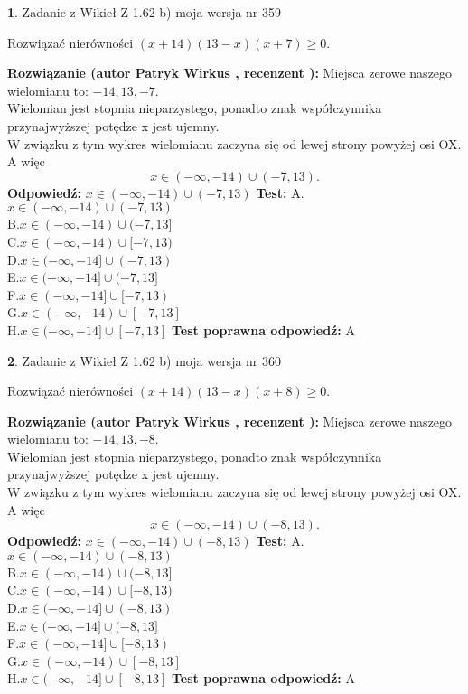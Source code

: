 \documentclass[12pt, a4paper]{article}
\theoremstyle{definition} %
\newtheorem{zad}{}
\newcommand{\zadStart}[1]{\begin{zad}#1\newline}
\newcommand{\zadStop}{\end{zad}}
\newcommand{\rozwStart}[2]{\noindent \textbf{Rozwiązanie (autor #1 , recenzent #2): }\newline}
\newcommand{\rozwStop}{\newline}
\newcommand{\odpStart}{\noindent \textbf{Odpowiedź:}\newline}
\newcommand{\odpStop}{\newline}
\newcommand{\testStart}{\noindent \textbf{Test:}\newline}
\newcommand{\testStop}{\newline}
\newcommand{\kluczStart}{\noindent \textbf{Test poprawna odpowiedź:}\newline}
\newcommand{\kluczStop}{\newline}
\begin{document}
\zadStart{Zadanie z Wikieł Z 1.62 b) moja wersja nr 359}

Rozwiązać nierówności $(x+14)(13-x)(x+7)\ge0$.
\zadStop
\rozwStart{Patryk Wirkus}{}
Miejsca zerowe naszego wielomianu to: $-14, 13, -7$.\\
Wielomian jest stopnia nieparzystego, ponadto znak współczynnika przy\linebreak najwyższej potędze x jest ujemny.\\ W związku z tym wykres wielomianu zaczyna się od lewej strony powyżej osi OX. A więc $$x \in (-\infty,-14) \cup (-7,13).$$
\rozwStop
\odpStart
$x \in (-\infty,-14) \cup (-7,13)$
\odpStop
\testStart
A.$x \in (-\infty,-14) \cup (-7,13)$\\
B.$x \in (-\infty,-14) \cup (-7,13]$\\
C.$x \in (-\infty,-14) \cup [-7,13)$\\
D.$x \in (-\infty,-14] \cup (-7,13)$\\
E.$x \in (-\infty,-14] \cup (-7,13]$\\
F.$x \in (-\infty,-14] \cup [-7,13)$\\
G.$x \in (-\infty,-14) \cup [-7,13]$\\
H.$x \in (-\infty,-14] \cup [-7,13]$
\testStop
\kluczStart
A
\kluczStop



\zadStart{Zadanie z Wikieł Z 1.62 b) moja wersja nr 360}

Rozwiązać nierówności $(x+14)(13-x)(x+8)\ge0$.
\zadStop
\rozwStart{Patryk Wirkus}{}
Miejsca zerowe naszego wielomianu to: $-14, 13, -8$.\\
Wielomian jest stopnia nieparzystego, ponadto znak współczynnika przy\linebreak najwyższej potędze x jest ujemny.\\ W związku z tym wykres wielomianu zaczyna się od lewej strony powyżej osi OX. A więc $$x \in (-\infty,-14) \cup (-8,13).$$
\rozwStop
\odpStart
$x \in (-\infty,-14) \cup (-8,13)$
\odpStop
\testStart
A.$x \in (-\infty,-14) \cup (-8,13)$\\
B.$x \in (-\infty,-14) \cup (-8,13]$\\
C.$x \in (-\infty,-14) \cup [-8,13)$\\
D.$x \in (-\infty,-14] \cup (-8,13)$\\
E.$x \in (-\infty,-14] \cup (-8,13]$\\
F.$x \in (-\infty,-14] \cup [-8,13)$\\
G.$x \in (-\infty,-14) \cup [-8,13]$\\
H.$x \in (-\infty,-14] \cup [-8,13]$
\testStop
\kluczStart
A
\kluczStop
\end{document}
